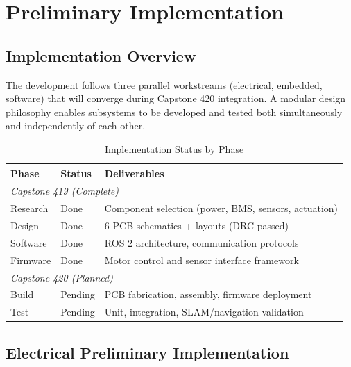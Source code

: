 
\section{Preliminary Implementation}
\label{sec:implementation}

\subsection{Implementation Overview}

The development follows three parallel workstreams (electrical, embedded, software) that will converge during Capstone 420 integration. A modular design philosophy enables subsystems to be developed and tested both simultaneously and independently of each other.

\begin{table}[H]
\centering
\caption{Implementation Status by Phase}
\begin{tabular}{@{}lll@{}}
\toprule
\textbf{Phase} & \textbf{Status} & \textbf{Deliverables} \\
\midrule
\multicolumn{3}{l}{\textit{Capstone 419 (Complete)}} \\
Research & Done & Component selection (power, BMS, sensors, actuation) \\
Design & Done & 6 PCB schematics + layouts (DRC passed) \\
Software & Done & ROS 2 architecture, communication protocols \\
Firmware & Done & Motor control and sensor interface framework \\
\midrule
\multicolumn{3}{l}{\textit{Capstone 420 (Planned)}} \\
Build & Pending & PCB fabrication, assembly, firmware deployment \\
Test & Pending & Unit, integration, SLAM/navigation validation \\
\bottomrule
\end{tabular}
\end{table}

\subsection{Electrical Preliminary Implementation}
\label{sec:electrical_impl}

